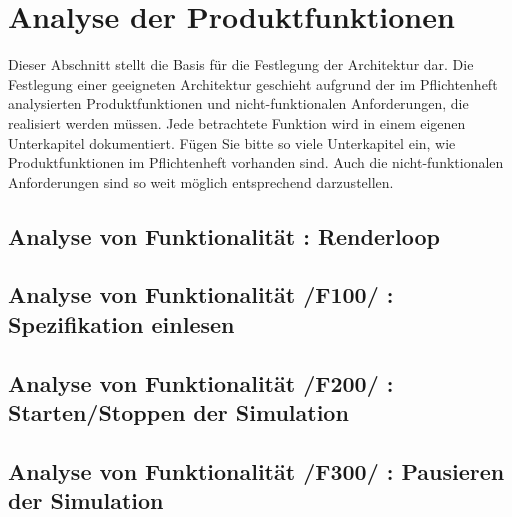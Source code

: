 \chapter{Analyse der Produktfunktionen}

Dieser Abschnitt stellt die Basis für die Festlegung der Architektur dar. Die
Festlegung einer geeigneten Architektur geschieht aufgrund der im Pflichtenheft
analysierten Produktfunktionen und nicht-funktionalen Anforderungen, die
realisiert werden müssen. Jede betrachtete Funktion wird in einem eigenen
Unterkapitel dokumentiert.  Fügen Sie bitte so viele Unterkapitel ein, wie
Produktfunktionen im Pflichtenheft vorhanden sind. Auch die nicht-funktionalen
Anforderungen sind so weit möglich entsprechend darzustellen.

%





\section{Analyse von Funktionalität :  Renderloop}

\section{Analyse von Funktionalität /F100/ :  Spezifikation einlesen }
\section{Analyse von Funktionalität /F200/ :  Starten/Stoppen der Simulation}
\section{Analyse von Funktionalität /F300/ :  Pausieren der Simulation}

